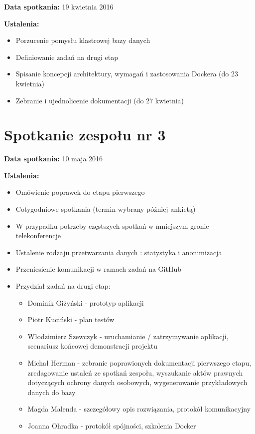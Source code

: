 \textbf{Data spotkania:} 19 kwietnia 2016

\textbf{Ustalenia:}

\begin{itemize}
\item Porzucenie pomysłu klastrowej bazy danych
\item Definiowanie zadań na drugi etap
\item Spisanie koncepcji architektury, wymagań i zastosowania Dockera (do 23 kwietnia)
\item Zebranie i ujednolicenie dokumentacji (do 27 kwietnia)
\end{itemize}


\section{Spotkanie zespołu nr 3}

\textbf{Data spotkania:} 10 maja 2016

\textbf{Ustalenia:}

\begin{itemize}
\item Omówienie poprawek do etapu pierwszego
\item Cotygodniowe spotkania (termin wybrany później ankietą)
\item W przypadku potrzeby częstszych spotkań w mniejszym gronie - telekonferencje
\item Ustalenie rodzaju przetwarzania danych : statystyka i anonimizacja
\item Przeniesienie komunikacji w ramach zadań na GitHub
\item Przydział zadań na drugi etap:
	\begin{itemize}
	\item Dominik Giżyński - prototyp aplikacji
	\item Piotr Kuciński - plan testów
	\item Włodzimierz Szewczyk - uruchamianie / zatrzymywanie aplikacji, scenariusz końcowej demonstracji projektu
	\item Michał Herman - zebranie poprawionych dokumentacji pierwszego etapu, zredagowanie ustaleń ze spotkań zespołu, wyszukanie aktów prawnych dotyczących ochrony danych osobowych, wygenerowanie przykładowych danych do bazy
	\item Magda Malenda - szczegółowy opis rozwiązania, protokół komunikacyjny
	\item Joanna Ohradka - protokół spójności, szkolenia Docker
	\end{itemize} 
\end{itemize}

